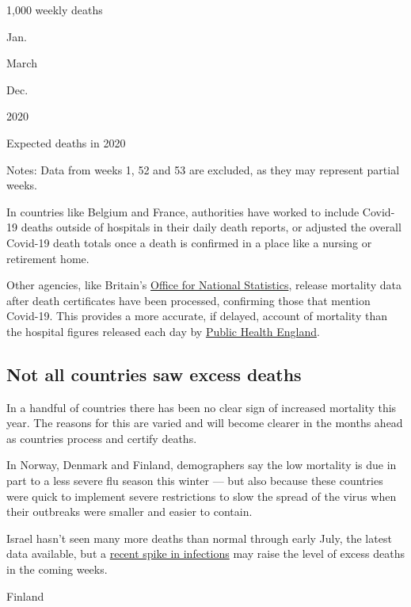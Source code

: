 1,000 weekly deaths

Jan.

March

Dec.

2020

Expected deaths in 2020

Notes: Data from weeks 1, 52 and 53 are excluded, as they may represent
partial weeks.

In countries like Belgium and France, authorities have worked to include
Covid-19 deaths outside of hospitals in their daily death reports, or
adjusted the overall Covid-19 death totals once a death is confirmed in
a place like a nursing or retirement home.

Other agencies, like Britain's
\href{https://www.ons.gov.uk/peoplepopulationandcommunity/birthsdeathsandmarriages/deaths/bulletins/deathsregisteredweeklyinenglandandwalesprovisional/weekending20march2020}{Office
for National Statistics}, release mortality data after death
certificates have been processed, confirming those that mention
Covid-19. This provides a more accurate, if delayed, account of
mortality than the hospital figures released each day by
\href{https://coronavirus.data.gov.uk/}{Public Health England}.

\hypertarget{not-all-countries-saw-excess-deaths}{%
\subsection{Not all countries saw excess
deaths}\label{not-all-countries-saw-excess-deaths}}

In a handful of countries there has been no clear sign of increased
mortality this year. The reasons for this are varied and will become
clearer in the months ahead as countries process and certify deaths.

In Norway, Denmark and Finland, demographers say the low mortality is
due in part to a less severe flu season this winter --- but also because
these countries were quick to implement severe restrictions to slow the
spread of the virus when their outbreaks were smaller and easier to
contain.

Israel hasn't seen many more deaths than normal through early July, the
latest data available, but a
\href{https://www.nytimes.com/2020/07/24/world/middleeast/israel-virus-protests-netanyahu.html}{recent
spike in infections} may raise the level of excess deaths in the coming
weeks.

Finland

